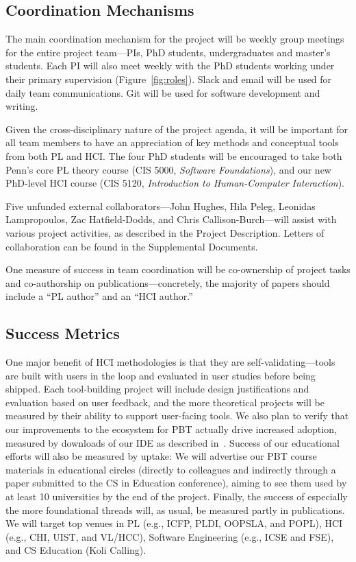 \subsection*{Coordination Mechanisms}

The main coordination mechanism for the project will be weekly group
meetings for the entire project team---PIs, PhD students, undergraduates and master's students.
%
Each PI will also meet weekly with the PhD students working under
their primary supervision (Figure~\ref{fig:roles}).
%
Slack and email will be used for daily team communications.  Git will
be used for software development and writing.

Given the cross-disciplinary nature of the project agenda, it will be
important for all team members to have an appreciation of key methods
and conceptual tools from both PL and HCI.  The four PhD students will
be encouraged to take both Penn's core PL theory course (CIS 5000,
{\em Software Foundations}), and our new PhD-level HCI course (CIS
5120, {\em Introduction to Human-Computer Interaction}).

Five unfunded external collaborators---John Hughes, Hila Peleg,
Leonidas Lampropoulos, Zac Hatfield-Dodds, and Chris
Callison-Burch---will assist with various project activities, as
described in the Project Description.  Letters of collaboration can be
found in the Supplemental Documents.

One measure of success in team coordination will be co-ownership of
project tasks and co-authorship on publications---concretely, the
majority of papers should include a ``PL author'' and
an ``HCI author.''

\subsection*{Success Metrics}

One major benefit of
HCI methodologies is that they are self-validating---tools are built with users
in the loop and evaluated in user studies before being shipped.
Each tool-building project will include design justifications and
evaluation based on user feedback, and the more theoretical
projects will be measured by their ability to support user-facing tools.
%
We also plan to verify that our improvements to the ecosystem for PBT
actually drive increased adoption, measured by
downloads of our \tyche{} IDE as described in~.
%
Success of our educational efforts will also be measured by uptake: We
will advertise our PBT course materials in educational circles
(directly to colleagues and indirectly through a paper
submitted to the CS in Education conference), aiming to see them used
by at least 10 universities by the end of the project.
%
Finally, the
success of especially the more foundational threads will, as usual, be measured
partly in publications.  We will target top venues in PL (e.g., ICFP, PLDI,
OOPSLA, and POPL), HCI (e.g., CHI, UIST, and VL/HCC), Software Engineering
(e.g., ICSE and FSE), and CS Education (Koli Calling).

\clearpage

